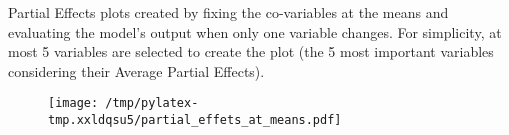 \documentclass{article}%
\begin{document}
                Partial Effects plots created by fixing the co-variables at
                the means and evaluating the model's output when only one
                variable changes. For simplicity, at most 5 variables are
                selected to create the plot (the 5 most important variables
                considering their Average Partial Effects).

                \vfill%


\begin{figure}[H]%
\centering%
\texttt{[image: /tmp/pylatex-tmp.xxldqsu5/partial\_effets\_at\_means.pdf]}%
\end{figure}

%
\vfill \pagebreak

%
\end{document}
